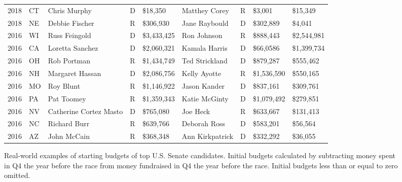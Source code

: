 \documentclass[11pt]{article}
\begin{document}
\begin{figure}
{\begin{tabular}{ |p{.3cm} p{.4cm}|p{2.7cm} p{.4cm} p{1.6cm}|p{2.7cm} p{.4cm} p{1.6cm}|p{1.3cm}|}
2018 & CT & Chris Murphy & D & \$18,350 & Matthey Corey & R & \$3,001 & \$15,349\\
2018 & NE & Debbie Fischer & R & \$306,930 & Jane Raybould & D & \$302,889 & \$4,041\\
\hline
2016 & WI & Russ Feingold & D & \$3,433,425 & Ron Johnson & R & \$888,443 & \$2,544,981\\
2016 & CA & Loretta Sanchez & D & \$2,060,321 & Kamala Harris & D & \$66,0586 & \$1,399,734\\
2016 & OH & Rob Portman & R & \$1,434,749 & Ted Strickland & D & \$879,287 & \$555,462\\
2016 & NH & Margaret Hassan & D & \$2,086,756 & Kelly Ayotte & R & \$1,536,590 & \$550,165\\
2016 & MO & Roy Blunt & R & \$1,146,922 & Jason Kander & D & \$837,161 & \$309,761\\
2016 & PA & Pat Toomey & R & \$1,359,343 & Katie McGinty & D & \$1,079,492 & \$279,851\\
2016 & NV & Catherine Cortez Masto & D & \$765,080 & Joe Heck & R & \$633,667 & \$131,413\\
2016 & NC & Richard Burr & R & \$639,766 & Deborah Ross & D & \$583,201 & \$56,564\\
2016 & AZ & John McCain & R & \$368,348 & Ann Kirkpatrick & D & \$332,292 & \$36,055\\
\hline
\end{tabular}
}
\caption{Real-world examples of starting budgets of top U.S. Senate candidates. Initial budgets calculated by subtracting money spent in Q4 the year before the race from money fundraised in Q4 the year before the race. Initial budgets less than or equal to zero omitted.}
\label{examplebudgets}
\end{figure}
\end{document}
